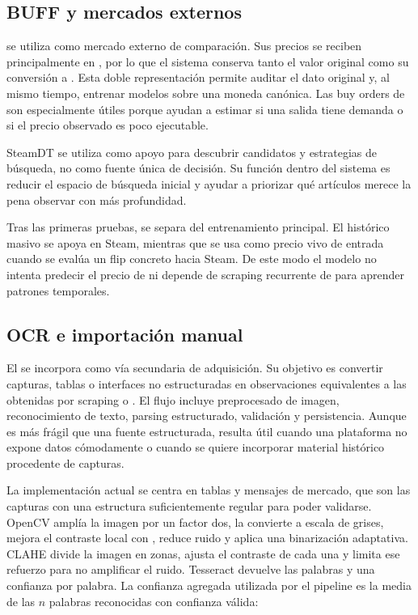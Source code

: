 \subsection{BUFF y mercados externos}

 se utiliza como mercado externo de comparación. Sus precios se reciben principalmente en , por lo que el sistema conserva tanto el valor original como su conversión a . Esta doble representación permite auditar el dato original y, al mismo tiempo, entrenar modelos sobre una moneda canónica. Las buy orders de  son especialmente útiles porque ayudan a estimar si una salida tiene demanda o si el precio observado es poco ejecutable.

SteamDT se utiliza como apoyo para descubrir candidatos y estrategias de búsqueda, no como fuente única de decisión. Su función dentro del sistema es reducir el espacio de búsqueda inicial y ayudar a priorizar qué artículos merece la pena observar con más profundidad.

Tras las primeras pruebas,  se separa del entrenamiento principal. El histórico masivo se apoya en Steam, mientras que  se usa como precio vivo de entrada cuando se evalúa un flip concreto hacia Steam. De este modo el modelo no intenta predecir el precio de  ni depende de scraping recurrente de  para aprender patrones temporales.

\subsection{OCR e importación manual}

El  se incorpora como vía secundaria de adquisición. Su objetivo es convertir capturas, tablas o interfaces no estructuradas en observaciones equivalentes a las obtenidas por scraping o . El flujo incluye preprocesado de imagen, reconocimiento de texto, parsing estructurado, validación y persistencia. Aunque es más frágil que una fuente estructurada, resulta útil cuando una plataforma no expone datos cómodamente o cuando se quiere incorporar material histórico procedente de capturas.

La implementación actual se centra en tablas y mensajes de mercado, que son las capturas con una estructura suficientemente regular para poder validarse. OpenCV amplía la imagen por un factor dos, la convierte a escala de grises, mejora el contraste local con , reduce ruido y aplica una binarización adaptativa. CLAHE divide la imagen en zonas, ajusta el contraste de cada una y limita ese refuerzo para no amplificar el ruido. Tesseract devuelve las palabras y una confianza por palabra. La confianza agregada utilizada por el pipeline es la media de las $n$ palabras reconocidas con confianza válida:

